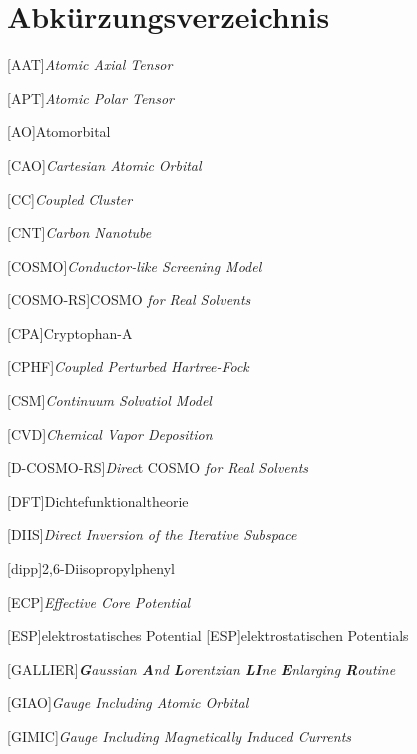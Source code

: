 \renewcommand\refname{Abkürzungsverzeichnis} \chapter{Abkürzungsverzeichnis}
\begin{acronym}[SEPSEP] %
    \setlength{\itemsep}{0.2cm} %
    
    [AAT]{\textit{Atomic Axial Tensor}}
    
    [APT]{\textit{Atomic Polar Tensor}}
    
    [AO]{Atomorbital}
	
	[CAO]{\textit{Cartesian Atomic Orbital}}
		
    [CC]{\textit{Coupled Cluster}}	
    
    [CNT]{\textit{Carbon Nanotube}}	
		
 	[COSMO]{\textit{Conductor-like Screening Model}}
 	
 	[COSMO-RS]{COSMO \textit{for Real Solvents}}

    [CPA]{Cryptophan-A} 	
 	
	[CPHF]{\textit{Coupled Perturbed Hartree-Fock}}
	
	[CSM]{\textit{Continuum Solvatiol Model}}
	
	[CVD]{\textit{Chemical Vapor Deposition}}
	
	[D-COSMO-RS]{\textit{Direc}t COSMO \textit{for Real Solvents}}
 	
    [DFT]{Dichtefunktionaltheorie}
    
    [DIIS]{\textit{Direct Inversion of the Iterative Subspace}}
    
    [dipp]{2,6-Diisopropylphenyl}
    
    [ECP]{\textit{Effective Core Potential}}
    
    [ESP]{elektrostatisches Potential}
	    [ESP]{elektrostatischen Potentials}

	[GALLIER]{\textit{\textbf{G}aussian \textbf{A}nd \textbf{L}orentzian \textbf{LI}ne \textbf{E}nlarging \textbf{R}outine}}
	
	[GIAO]{\textit{Gauge Including Atomic Orbital}}   
	
	[GIMIC]{\textit{Gauge Including Magnetically Induced Currents}} 


\end{acronym}
